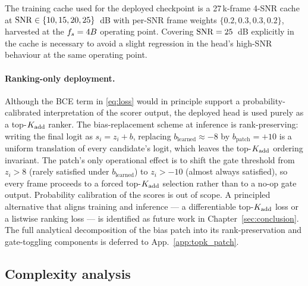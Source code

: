 The training cache used for the deployed checkpoint is a 27\,k-frame 4-SNR cache at $\mathrm{SNR} \in \{10, 15, 20, 25\}$~dB with per-SNR frame weights $\{0.2, 0.3, 0.3, 0.2\}$, harvested at the $f_s = 4B$ operating point. Covering $\mathrm{SNR} = 25$~dB explicitly in the cache is necessary to avoid a slight regression in the head's high-SNR behaviour at the same operating point.

\paragraph{Ranking-only deployment.}
Although the BCE term in \eqref{eq:loss} would in principle support a probability-calibrated interpretation of the scorer output, the deployed head is used purely as a top-$K_{\mathrm{add}}$ ranker. The bias-replacement scheme at inference is rank-preserving: writing the final logit as $s_i = z_i + b$, replacing $b_{\text{learned}} \approx -8$ by $b_{\text{patch}} = +10$ is a uniform translation of every candidate's logit, which leaves the top-$K_{\mathrm{add}}$ ordering invariant. The patch's only operational effect is to shift the gate threshold from $z_i > 8$ (rarely satisfied under $b_{\text{learned}}$) to $z_i > -10$ (almost always satisfied), so every frame proceeds to a forced top-$K_{\mathrm{add}}$ selection rather than to a no-op gate output. Probability calibration of the scores is out of scope. A principled alternative that aligns training and inference --- a differentiable top-$K_{\mathrm{add}}$ loss or a listwise ranking loss --- is identified as future work in Chapter~\ref{sec:conclusion}. The full analytical decomposition of the bias patch into its rank-preservation and gate-toggling components is deferred to App.~\ref{app:topk_patch}.

\subsection{Complexity analysis}
\label{ssec:complexity}

